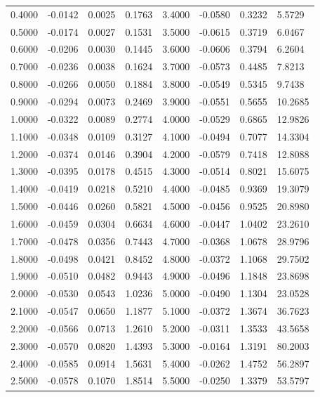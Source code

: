 \documentclass[aoas,preprint]{imsart}
\numberwithin{equation}{section}
\theoremstyle{plain}
\begin{document}
\begin{itemize}
\begin{table}[htb!]
\begin{tabular}{l|l|l|l||l|l|l|l}
      0.4000 & -0.0142 & 0.0025 & 0.1763 & 3.4000 & -0.0580 & 0.3232 & 5.5729 \\
      0.5000 & -0.0174 & 0.0027 & 0.1531 & 3.5000 & -0.0615 & 0.3719 & 6.0467 \\
      0.6000 & -0.0206 & 0.0030 & 0.1445 & 3.6000 & -0.0606 & 0.3794 & 6.2604 \\
      0.7000 & -0.0236 & 0.0038 & 0.1624 & 3.7000 & -0.0573 & 0.4485 & 7.8213 \\
      0.8000 & -0.0266 & 0.0050 & 0.1884 & 3.8000 & -0.0549 & 0.5345 & 9.7438 \\
      0.9000 & -0.0294 & 0.0073 & 0.2469 & 3.9000 & -0.0551 & 0.5655 & 10.2685 \\
      1.0000 & -0.0322 & 0.0089 & 0.2774 & 4.0000 & -0.0529 & 0.6865 & 12.9826 \\
      1.1000 & -0.0348 & 0.0109 & 0.3127 & 4.1000 & -0.0494 & 0.7077 & 14.3304 \\
      1.2000 & -0.0374 & 0.0146 & 0.3904 & 4.2000 & -0.0579 & 0.7418 & 12.8088 \\
      1.3000 & -0.0395 & 0.0178 & 0.4515 & 4.3000 & -0.0514 & 0.8021 & 15.6075 \\
      1.4000 & -0.0419 & 0.0218 & 0.5210 & 4.4000 & -0.0485 & 0.9369 & 19.3079 \\
      1.5000 & -0.0446 & 0.0260 & 0.5821 & 4.5000 & -0.0456 & 0.9525 & 20.8980 \\
      1.6000 & -0.0459 & 0.0304 & 0.6634 & 4.6000 & -0.0447 & 1.0402 & 23.2610 \\
      1.7000 & -0.0478 & 0.0356 & 0.7443 & 4.7000 & -0.0368 & 1.0678 & 28.9796 \\
      1.8000 & -0.0498 & 0.0421 & 0.8452 & 4.8000 & -0.0372 & 1.1068 & 29.7502 \\
      1.9000 & -0.0510 & 0.0482 & 0.9443 & 4.9000 & -0.0496 & 1.1848 & 23.8698 \\
      2.0000 & -0.0530 & 0.0543 & 1.0236 & 5.0000 & -0.0490 & 1.1304 & 23.0528 \\
      2.1000 & -0.0547 & 0.0650 & 1.1877 & 5.1000 & -0.0372 & 1.3674 & 36.7623 \\
      2.2000 & -0.0566 & 0.0713 & 1.2610 & 5.2000 & -0.0311 & 1.3533 & 43.5658 \\
      2.3000 & -0.0570 & 0.0820 & 1.4393 & 5.3000 & -0.0164 & 1.3191 & 80.2003 \\
      2.4000 & -0.0585 & 0.0914 & 1.5631 & 5.4000 & -0.0262 & 1.4752 & 56.2897 \\
      2.5000 & -0.0578 & 0.1070 & 1.8514 & 5.5000 & -0.0250 & 1.3379 & 53.5797 \\

\end{tabular}
\end{table}
\end{itemize}
\end{document}

